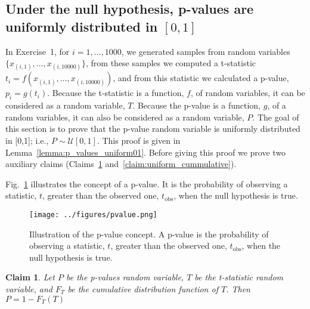\documentclass[12pt]{article}
\newtheorem{claim}{Claim}
\def\fig_width{3.5in}
\begin{document}
\pagebreak
\begin{appendices}

\section{Under the null hypothesis, p-values are uniformly distributed in $[0,1]$}
\label{sec:pValuesAreUniform}

In Exercise~1, for $i=1,\ldots,1000$, we generated samples from random variables
$\{x_{(i,1)},\ldots,x_{(i,10000)}\}$, from these samples we computed a t-statistic
$t_i=f(x_{(i,1)},\ldots,x_{(i,10000)})$, and from this statistic we calculated a
p-value, $p_i=g(t_i)$. Because the t-statistic is a function, $f$, of random
variables, it can be considered as a random variable, $T$. Because the
p-value is a function, $g$, of a random variables, it can also be considered as
a random variable, $P$. The goal of this section is to prove that the p-value random
variable is uniformly distributed in [0,1]; i.e., $P\sim\mathcal{U}[0,1]$. This
proof is given in Lemma~\ref{lemma:p_values_uniform01}. Before giving this
proof we prove two auxiliary claims (Claims~\ref{claim:pvalue_as_function_of_stat}
and~\ref{claim:uniform_cummulative}).

Fig.~\ref{fig:pvalue} illustrates the concept of a p-value. It is the
probability of observing a statistic, $t$, greater than the observed one,
$t_\text{obs}$, when the null hypothesis is true.

\begin{figure}[H]
    \begin{center}
        \texttt{[image: ../figures/pvalue.png]}

        \caption{Illustration of the p-value concept. A p-value is the
        probability of observing a statistic, $t$, greater than the observed
        one, $t_\text{obs}$, when the null hypothesis is true.}
        \label{fig:pvalue}

    \end{center}
\end{figure}

\begin{claim}

    Let $P$ be the p-values random variable, $T$ be the t-statistic random
    variable, and $F_T$ be the cumulative distribution function of $T$. Then
    $P=1-F_T(T)$
    \label{claim:pvalue_as_function_of_stat}

\end{claim}


\end{appendices}
\end{document}
